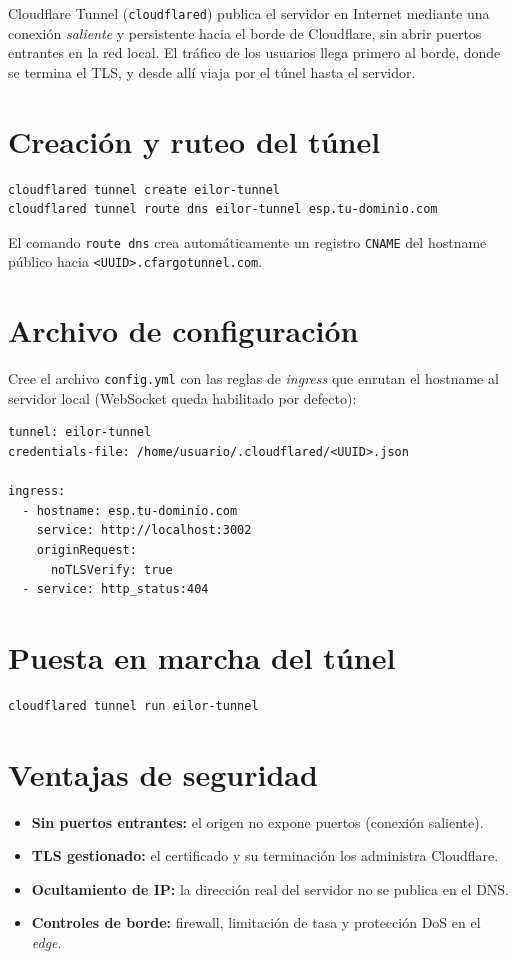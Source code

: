 \documentclass[12pt,a4paper,oneside]{report}
\newcommand{\code}[1]{\texttt{\small #1}}
\begin{document}
Cloudflare Tunnel (\code{cloudflared}) publica el servidor en Internet mediante una
conexión \emph{saliente} y persistente hacia el borde de Cloudflare, sin abrir
puertos entrantes en la red local. El tráfico de los usuarios llega primero al
borde, donde se termina el TLS, y desde allí viaja por el túnel hasta el servidor.

\section{Creación y ruteo del túnel}
\begin{lstlisting}[style=bash,caption={Alta del túnel y registro DNS}]
cloudflared tunnel create eilor-tunnel
cloudflared tunnel route dns eilor-tunnel esp.tu-dominio.com
\end{lstlisting}

El comando \code{route dns} crea automáticamente un registro \code{CNAME} del
hostname público hacia \code{<UUID>.cfargotunnel.com}.

\section{Archivo de configuración}
Cree el archivo \code{config.yml} con las reglas de \emph{ingress} que enrutan el
hostname al servidor local (WebSocket queda habilitado por defecto):

\begin{lstlisting}[caption={Configuración de Cloudflare Tunnel (config.yml)},basicstyle=\ttfamily\footnotesize]
tunnel: eilor-tunnel
credentials-file: /home/usuario/.cloudflared/<UUID>.json

ingress:
  - hostname: esp.tu-dominio.com
    service: http://localhost:3002
    originRequest:
      noTLSVerify: true
  - service: http_status:404
\end{lstlisting}

\section{Puesta en marcha del túnel}
\begin{lstlisting}[style=bash,caption={Ejecución del túnel}]
cloudflared tunnel run eilor-tunnel
\end{lstlisting}

\section{Ventajas de seguridad}
\begin{itemize}[leftmargin=1.4em]
  \item \textbf{Sin puertos entrantes:} el origen no expone puertos (conexión saliente).
  \item \textbf{TLS gestionado:} el certificado y su terminación los administra Cloudflare.
  \item \textbf{Ocultamiento de IP:} la dirección real del servidor no se publica en el DNS.
  \item \textbf{Controles de borde:} firewall, limitación de tasa y protección DoS en el \emph{edge}.
\end{itemize}
\end{document}
